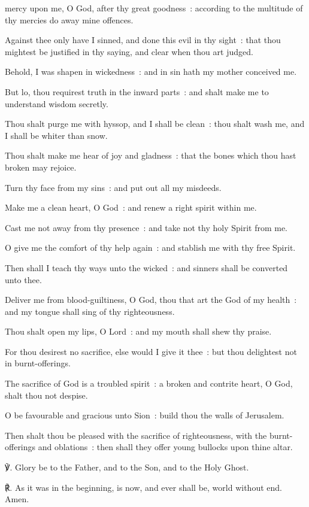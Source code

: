  mercy upon me, O God, after thy great goodness~: according to the multitude of thy mercies do away mine offences.\par
{}
Against thee only have I sinned, and done this evil in thy sight~: that thou mightest be justified in thy saying, and clear when thou art judged.\par
{}Behold, I was shapen in wickedness~: and in sin hath my mother conceived me.\par
{}But lo, thou requirest truth in the inward parts~: and shalt make me to understand wisdom secretly.\par
{}Thou shalt purge me with hyssop, and I shall be clean~: thou shalt wash me, and I shall be whiter than snow.\par
{}Thou shalt make me hear of joy and gladness~: that the bones which thou hast broken may rejoice.\par
{}Turn thy face from my sins~: and put out all my misdeeds.\par
{}Make me a clean heart, O God~: and renew a right spirit within me.\par
{}Cast me not away from thy presence~: and take not thy holy Spirit from me.\par
{}O give me the comfort of thy help again~: and stablish me with thy free Spirit.\par
{}Then shall I teach thy ways unto the wicked~: and sinners shall be converted unto thee.\par
{}Deliver me from blood-guiltiness, O God, thou that art the God of my health~: and my tongue shall sing of thy righteousness.\par
{}Thou shalt open my lips, O Lord~: and my mouth shall shew thy praise.\par
{}For thou desirest no sacrifice, else would I give it thee~: but thou delightest not in burnt-offerings.\par
{}The sacrifice of God is a troubled spirit~: a broken and contrite heart, O God, shalt thou not despise.\par
{}O be favourable and gracious unto Sion~: build thou the walls of Jerusalem.\par
{}Then shalt thou be pleased with the sacrifice of righteousness, with the burnt-offerings and oblations~: then shall they offer young bullocks upon thine altar.\par
℣. Glory be to the Father, and to the Son, and to the Holy Ghost.\par
℟. As it was in the beginning, is now, and ever shall be, world without end. Amen.\par

